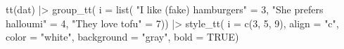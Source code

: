 \documentclass[
  letterpaper,
  DIV=11,
  numbers=noendperiod]{scrartcl}
\newenvironment{Shaded}{\begin{snugshade}}{\end{snugshade}}
\newcommand{\AttributeTok}[1]{\textcolor[rgb]{0.40,0.45,0.13}{#1}}
\newcommand{\ConstantTok}[1]{\textcolor[rgb]{0.56,0.35,0.01}{#1}}
\newcommand{\DecValTok}[1]{\textcolor[rgb]{0.68,0.00,0.00}{#1}}
\newcommand{\FunctionTok}[1]{\textcolor[rgb]{0.28,0.35,0.67}{#1}}
\newcommand{\NormalTok}[1]{\textcolor[rgb]{0.00,0.23,0.31}{#1}}
\newcommand{\OtherTok}[1]{\textcolor[rgb]{0.00,0.23,0.31}{#1}}
\newcommand{\SpecialCharTok}[1]{\textcolor[rgb]{0.37,0.37,0.37}{#1}}
\newcommand{\StringTok}[1]{\textcolor[rgb]{0.13,0.47,0.30}{#1}}
\begin{document}
\begin{Shaded}
\begin{Highlighting}[]
\FunctionTok{tt}\NormalTok{(dat) }\SpecialCharTok{|\textgreater{}} 
  \FunctionTok{group\_tt}\NormalTok{(}
    \AttributeTok{i =} \FunctionTok{list}\NormalTok{(}
      \StringTok{"I like (fake) hamburgers"} \OtherTok{=} \DecValTok{3}\NormalTok{,}
      \StringTok{"She prefers halloumi"} \OtherTok{=} \DecValTok{4}\NormalTok{,}
      \StringTok{"They love tofu"} \OtherTok{=} \DecValTok{7}\NormalTok{)) }\SpecialCharTok{|\textgreater{}}
  \FunctionTok{style\_tt}\NormalTok{(}
    \AttributeTok{i =} \FunctionTok{c}\NormalTok{(}\DecValTok{3}\NormalTok{, }\DecValTok{5}\NormalTok{, }\DecValTok{9}\NormalTok{),}
    \AttributeTok{align =} \StringTok{"c"}\NormalTok{,}
    \AttributeTok{color =} \StringTok{"white"}\NormalTok{,}
    \AttributeTok{background =} \StringTok{"gray"}\NormalTok{,}
    \AttributeTok{bold =} \ConstantTok{TRUE}\NormalTok{)}
\end{Highlighting}
\end{Shaded}
\end{document}
